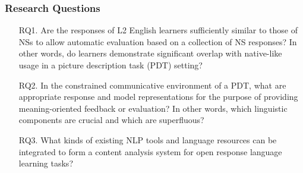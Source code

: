 \documentclass[xcolor={dvipsnames}]{beamer}
\begin{document}
\begin{frame}
\frametitle{Research Questions}
\small
\pause
\begin{itemize}
\pause
\vspace{2em}
\item[RQ1.]{Are the responses of L2 English learners sufficiently similar to those of NSs to allow automatic evaluation based on a collection of NS responses? In other words, do learners demonstrate significant overlap with native-like usage in a picture description task (PDT) setting?} %
\vspace{2em}
\pause
\item[RQ2.]{In the constrained communicative environment of a PDT, what are appropriate response and model representations for the purpose of providing meaning-oriented feedback or evaluation? In other words, which linguistic components are crucial and which are superfluous?}

\pause
\vspace{2em}
\item[RQ3.]{What kinds of existing NLP tools and language resources can be integrated to form a content analysis system for open response language learning tasks?}
\end{itemize}
\end{frame}
\end{document}
